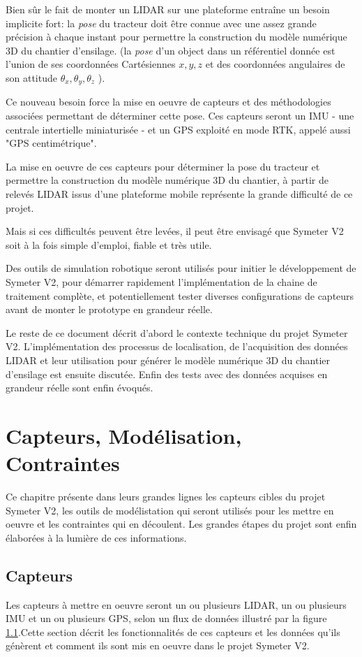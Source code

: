\documentclass[12pt,a4paper]{report}
\begin{document}
		\para Bien sûr le fait de monter un LIDAR sur une plateforme entraîne un besoin implicite fort: la \textit{pose} du tracteur doit être connue avec une assez grande précision à chaque instant pour permettre la construction du modèle numérique 3D du chantier d'ensilage. (la \textit{pose} d'un object dans un référentiel donnée est l'union de ses coordonnées Cartésiennes $x,y,z$ et des coordonnées angulaires de son attitude $\theta_x, \theta_y, \theta_z$ ).
		
		\para Ce nouveau besoin force la mise en oeuvre de capteurs et des méthodologies associées permettant de déterminer cette pose. Ces capteurs seront un IMU - une centrale intertielle miniaturisée - et un GPS exploité en mode RTK, appelé aussi "GPS centimétrique".
		
		\para La mise en oeuvre de ces capteurs pour déterminer la pose du tracteur et permettre la construction du modèle numérique 3D du chantier, à partir de relevés LIDAR issus d'une plateforme mobile représente la grande difficulté de ce projet.
		
		\para Mais si ces difficultés peuvent être levées, il peut être envisagé que Symeter V2 soit à la fois simple d'emploi, fiable et très utile.
		
		\para Des outils de simulation robotique seront utilisés pour initier le développement de Symeter V2, pour démarrer rapidement l'implémentation de la chaine de traitement complète, et potentiellement tester diverses configurations de capteurs avant de monter le prototype en grandeur réelle.
		
		\para Le reste de ce document décrit d'abord le contexte technique du projet Symeter V2. L'implémentation des processus de localisation, de l'acquisition des données LIDAR et leur utilisation pour générer le modèle numérique 3D du chantier d'ensilage est ensuite discutée. Enfin des tests avec des données acquises en grandeur réelle sont enfin évoqués.

		


\chapter{Capteurs, Modélisation, Contraintes}
	Ce chapitre présente dans leurs grandes lignes les capteurs cibles du projet Symeter V2, les outils de modélistation qui seront utilisés pour les mettre en oeuvre et les contraintes qui en découlent. Les grandes étapes du projet sont enfin élaborées à la lumière de ces informations.
	
	\section{Capteurs}
		Les capteurs à mettre en oeuvre seront un ou plusieurs LIDAR, un ou plusieurs IMU et un ou plusieurs GPS, selon un flux de données illustré par la figure \ref{}.Cette section décrit les fonctionnalités de ces capteurs et les données qu'ils génèrent et comment ils sont mis en oeuvre dans le projet Symeter V2.
		
\end{document}
